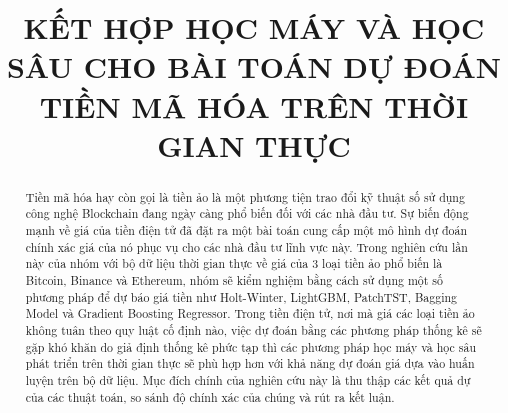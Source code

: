 \documentclass[conference]{IEEEtran}
\begin{document}
\title{KẾT HỢP HỌC MÁY VÀ HỌC SÂU CHO BÀI TOÁN DỰ ĐOÁN TIỀN MÃ HÓA TRÊN THỜI GIAN THỰC\\
}

\author{
\and
{}
\and
{}
\and
\and
}

\maketitle

\begin{abstract}
Tiền mã hóa hay còn gọi là tiền ảo là một phương tiện trao đổi kỹ thuật số sử dụng công nghệ Blockchain đang ngày càng phổ biến đối với các nhà đầu tư. Sự biến động mạnh về giá của tiền điện tử đã đặt ra một bài toán cung cấp một mô hình dự đoán chính xác giá của nó phục vụ cho các nhà đầu tư lĩnh vực này. Trong nghiên cứu lần này của nhóm với bộ dữ liệu thời gian thực về giá của 3 loại tiền ảo phổ biến là Bitcoin, Binance và Ethereum, nhóm sẽ kiểm nghiệm bằng cách sử dụng một số phương pháp để dự báo giá tiền như Holt-Winter, LightGBM, PatchTST, Bagging Model và Gradient Boosting Regressor. Trong tiền điện tử, nơi mà giá các loại tiền ảo không tuân theo quy luật cố định nào, việc dự đoán bằng các phương pháp thống kê sẽ gặp khó khăn do giả định thống kê phức tạp thì các phương pháp học máy và học sâu phát triển trên thời gian thực sẽ phù hợp hơn với khả năng dự đoán giá dựa vào huấn luyện trên bộ dữ liệu. Mục đích chính của nghiên cứu này là thu thập các kết quả dự của các thuật toán, so sánh độ chính xác của chúng và rút ra kết luận.
\end{abstract}
\end{document}
